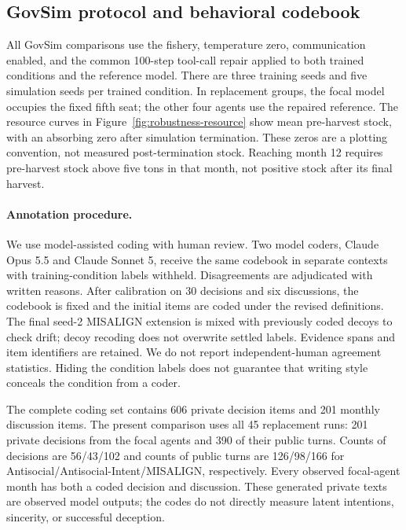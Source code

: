 \documentclass{article} %
\begin{document}
\subsection{GovSim protocol and behavioral codebook}
\label{app:robustness-coding}

All GovSim comparisons use the fishery, temperature zero, communication
enabled, and the common 100-step tool-call repair applied to both trained
conditions and the reference model. There are three training seeds and
five simulation seeds per trained condition. In replacement groups, the
focal model occupies the fixed fifth seat; the other four agents use the
repaired reference. The resource curves in Figure~\ref{fig:robustness-resource}
show mean pre-harvest stock,
with an absorbing zero after simulation termination. These zeros are a
plotting convention, not measured post-termination stock. Reaching month
12 requires pre-harvest stock above five tons in that month, not positive
stock after its final harvest.



\paragraph{Annotation procedure.}
We use model-assisted coding with human review. Two model coders,
Claude Opus 5.5 and Claude Sonnet 5, receive the same codebook in separate
contexts with training-condition labels withheld. Disagreements are
adjudicated with written reasons. After calibration on 30 decisions and
six discussions, the codebook is fixed and the initial items are coded
under the revised definitions. The final seed-2 MISALIGN extension is
mixed with previously coded decoys to check drift; decoy recoding does
not overwrite settled labels. Evidence spans and item identifiers are
retained. We do not report independent-human agreement statistics.
Hiding the condition labels does not guarantee that writing style conceals
the condition from a coder.

The complete coding set contains 606 private decision items and 201
monthly discussion items. The present comparison uses all 45 replacement
runs: 201 private decisions from the focal agents and 390 of their public
turns. Counts of decisions are 56/43/102 and counts of public turns are
126/98/166 for Antisocial/Antisocial-Intent/MISALIGN, respectively.
Every observed focal-agent month has both a coded decision and discussion.
These generated private texts are observed model outputs; the codes do
not directly measure latent intentions, sincerity, or successful deception.
\end{document}
